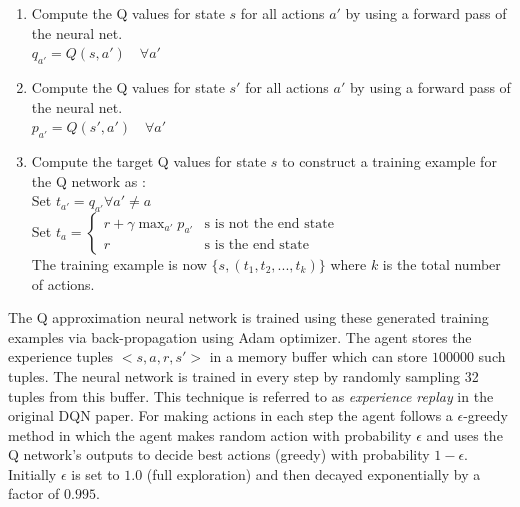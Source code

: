\documentclass{svproc}
\begin{document}
\begin{enumerate}
	\item Compute the Q values for state $s$ for all actions $a'$ by using a forward pass of the neural net.\\$q_{a'} = Q(s, a') \quad \forall a'$\\
	\item Compute the Q values for state $s'$ for all actions $a'$ by using a forward pass of the neural net.\\$p_{a'} = Q(s', a') \quad \forall a'$\\
	\item Compute the target Q values for state $s$ to construct a training example for the Q network as :\\
	Set $t_{a'} = q_{a'} \forall a' \neq a$\\Set $ t_{a} = \begin{cases} r + \gamma \max_{a'}p_{a'} & \text{s is not the end state}\\ r & \text{s is the end state}        \end{cases}$\\ The training example is now $\{s, (t_1, t_2, ..., t_k)\}$ where $k$ is the total number of actions.
\end{enumerate}
The Q approximation neural network is trained using these generated training examples via back-propagation using Adam\cite{adam} optimizer. The agent stores the experience tuples $<s, a, r, s'>$ in a memory buffer which can store $100000$ such tuples. The neural network is trained in every step by randomly sampling 32 tuples from this buffer. This technique is referred to as \textit{experience replay} in the original DQN paper. For making actions in each step the agent follows a $\epsilon$-greedy method in which the agent makes random action with probability $\epsilon$ and uses the Q network's outputs to decide best actions (greedy) with probability $1-\epsilon$. Initially $\epsilon$ is set to $1.0$ (full exploration) and then decayed exponentially by a factor of $0.995$.
\end{document}
